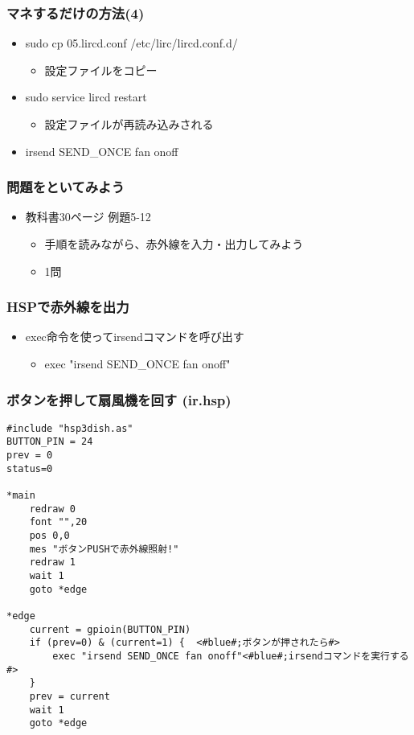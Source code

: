 \begin{frame}
    \frametitle{マネするだけの方法(4)}
    \begin{itemize}
        \item sudo cp 05.lircd.conf /etc/lirc/lircd.conf.d/
        \begin{itemize}
            \item 設定ファイルをコピー
        \end{itemize}
        \item sudo service lircd restart
        \begin{itemize}
            \item 設定ファイルが再読み込みされる
        \end{itemize}
        \item irsend SEND\_ONCE \color{red}fan onoff\color{black}
    \end{itemize}
\end{frame}

\begin{frame}
    \frametitle{問題をといてみよう}
    \begin{itemize}
        \item 教科書30ページ 例題5-12
        \begin{itemize}
            \item 手順を読みながら、赤外線を入力・出力してみよう
            \item 1問
        \end{itemize}
    \end{itemize}
\end{frame}

\begin{frame}
    \frametitle{HSPで赤外線を出力}
    \begin{itemize}
        \item exec命令を使ってirsendコマンドを呼び出す
        \begin{itemize}
            \item exec "irsend SEND\_ONCE fan onoff" 
        \end{itemize}
    \end{itemize}
\end{frame}

\begin{frame}[fragile]
    \frametitle{ボタンを押して扇風機を回す (ir.hsp)}
\begin{lstlisting}
#include "hsp3dish.as"
BUTTON_PIN = 24
prev = 0
status=0

*main
    redraw 0 
    font "",20
    pos 0,0
    mes "ボタンPUSHで赤外線照射!"
    redraw 1
    wait 1
    goto *edge

*edge
    current = gpioin(BUTTON_PIN)
    if (prev=0) & (current=1) {	 <#blue#;ボタンが押されたら#>
        exec "irsend SEND_ONCE fan onoff"<#blue#;irsendコマンドを実行する#>
    }
    prev = current
    wait 1
    goto *edge
\end{lstlisting}
\end{frame}

